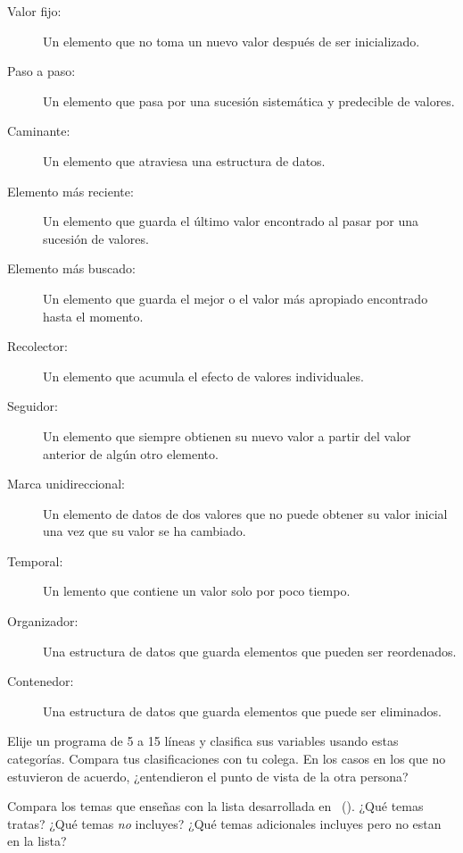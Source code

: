 \begin{description}

\item[Valor fijo:]
  Un elemento que no toma un nuevo valor después de ser inicializado.

\item[Paso a paso:]
  Un elemento que pasa por una sucesión sistemática y predecible de valores.

\item[Caminante:]
  Un elemento que atraviesa una estructura de datos.

\item[Elemento más reciente:]
  Un elemento que guarda el último valor encontrado
  al pasar por una sucesión de valores.

\item[Elemento más buscado:]
  Un elemento que guarda el mejor o el valor más apropiado encontrado hasta el momento.

\item[Recolector:]
  Un elemento que acumula el efecto de valores individuales.

\item[Seguidor:]
  Un elemento que siempre obtienen su nuevo valor a partir del valor anterior de algún otro elemento.

\item[Marca unidireccional:]
  Un elemento de datos de dos valores que no puede obtener su valor inicial una vez que su valor se ha cambiado.

\item[Temporal:]
  Un lemento que contiene un valor solo por poco tiempo.

\item[Organizador:]
  Una estructura de datos que guarda elementos que pueden ser reordenados.

\item[Contenedor:]
  Una estructura de datos que guarda elementos que puede ser eliminados.

\end{description}

Elije un programa de 5 a 15 líneas y clasifica sus variables usando estas categorías.
Compara tus clasificaciones con tu colega.
En los casos en los que no estuvieron de acuerdo,
¿entendieron el punto de vista de la otra persona?


Compara los temas que enseñas con la lista desarrollada en~\cite{Luxt2017} ().
¿Qué temas tratas?
¿Qué temas \emph{no} incluyes?
¿Qué temas adicionales incluyes pero no estan en la lista?

